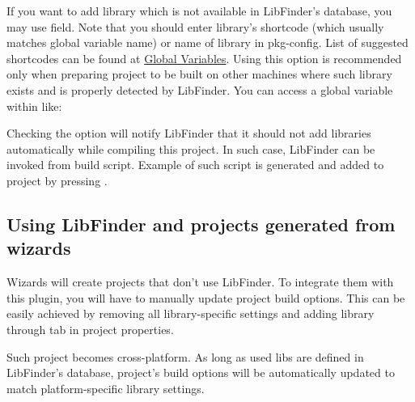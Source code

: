 If you want to add library which is not available in LibFinder's database, you may use  field. Note that you should enter library's shortcode (which usually matches global variable name) or name of library in pkg-config. List of suggested shortcodes can be found at \href{http://wiki.codeblocks.org/index.php?title=Recommended_global_variables}{Global Variables}. Using this option is recommended only when preparing project to be built on other machines where such library exists and is properly detected by LibFinder. You can access a global variable within \codeblocks like:


Checking the  option will notify LibFinder that it should not add libraries automatically while compiling this project. In such case, LibFinder can be invoked from build script. Example of such script is generated and added to project by pressing .

\subsection{Using LibFinder and projects generated from wizards}

Wizards will create projects that don't use LibFinder. To integrate them with this plugin, you will have to manually update project build options. This can be easily achieved by removing all library-specific settings and adding library through  tab in project properties.

Such project becomes cross-platform. As long as used libs are defined in LibFinder's database, project's build options will be automatically updated to match platform-specific library settings.


